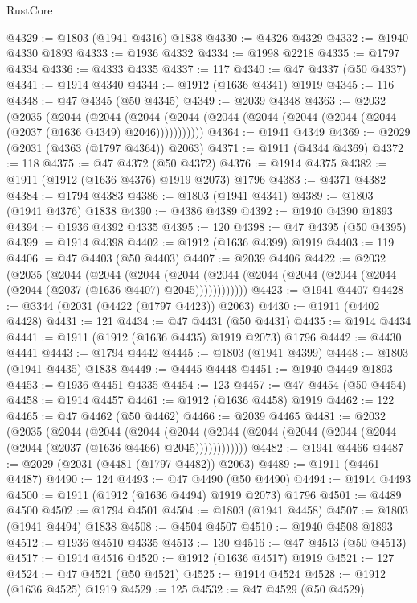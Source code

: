 \begin{lexlean}{RustCore}
\begin{coremodule}
@4329 := @1803 (@1941 @4316) @1838
@4330 := @4326 @4329
@4332 := @1940 @4330 @1893
@4333 := @1936 @4332
@4334 := @1998 @2218
@4335 := @1797 @4334
@4336 := @4333 @4335
@4337 := 117
@4340 := @47 @4337 (@50 @4337)
@4341 := @1914 @4340
@4344 := @1912 (@1636 @4341) @1919
@4345 := 116
@4348 := @47 @4345 (@50 @4345)
@4349 := @2039 @4348
@4363 := @2032
    (@2035
      (@2044
        (@2044
          (@2044 (@2044 (@2044 (@2044 (@2044 (@2044 (@2044 (@2037 (@1636 @4349) @2046)))))))))))
@4364 := @1941 @4349
@4369 := @2029 (@2031 (@4363 (@1797 @4364)) @2063)
@4371 := @1911 (@4344 @4369)
@4372 := 118
@4375 := @47 @4372 (@50 @4372)
@4376 := @1914 @4375
@4382 := @1911 (@1912 (@1636 @4376) @1919 @2073) @1796
@4383 := @4371 @4382
@4384 := @1794 @4383
@4386 := @1803 (@1941 @4341)
@4389 := @1803 (@1941 @4376) @1838
@4390 := @4386 @4389
@4392 := @1940 @4390 @1893
@4394 := @1936 @4392 @4335
@4395 := 120
@4398 := @47 @4395 (@50 @4395)
@4399 := @1914 @4398
@4402 := @1912 (@1636 @4399) @1919
@4403 := 119
@4406 := @47 @4403 (@50 @4403)
@4407 := @2039 @4406
@4422 := @2032
    (@2035
      (@2044
        (@2044
          (@2044
            (@2044 (@2044 (@2044 (@2044 (@2044 (@2044 (@2044 (@2037 (@1636 @4407) @2045))))))))))))
@4423 := @1941 @4407
@4428 := @3344 (@2031 (@4422 (@1797 @4423)) @2063)
@4430 := @1911 (@4402 @4428)
@4431 := 121
@4434 := @47 @4431 (@50 @4431)
@4435 := @1914 @4434
@4441 := @1911 (@1912 (@1636 @4435) @1919 @2073) @1796
@4442 := @4430 @4441
@4443 := @1794 @4442
@4445 := @1803 (@1941 @4399)
@4448 := @1803 (@1941 @4435) @1838
@4449 := @4445 @4448
@4451 := @1940 @4449 @1893
@4453 := @1936 @4451 @4335
@4454 := 123
@4457 := @47 @4454 (@50 @4454)
@4458 := @1914 @4457
@4461 := @1912 (@1636 @4458) @1919
@4462 := 122
@4465 := @47 @4462 (@50 @4462)
@4466 := @2039 @4465
@4481 := @2032
    (@2035
      (@2044
        (@2044
          (@2044
            (@2044 (@2044 (@2044 (@2044 (@2044 (@2044 (@2044 (@2037 (@1636 @4466) @2045))))))))))))
@4482 := @1941 @4466
@4487 := @2029 (@2031 (@4481 (@1797 @4482)) @2063)
@4489 := @1911 (@4461 @4487)
@4490 := 124
@4493 := @47 @4490 (@50 @4490)
@4494 := @1914 @4493
@4500 := @1911 (@1912 (@1636 @4494) @1919 @2073) @1796
@4501 := @4489 @4500
@4502 := @1794 @4501
@4504 := @1803 (@1941 @4458)
@4507 := @1803 (@1941 @4494) @1838
@4508 := @4504 @4507
@4510 := @1940 @4508 @1893
@4512 := @1936 @4510 @4335
@4513 := 130
@4516 := @47 @4513 (@50 @4513)
@4517 := @1914 @4516
@4520 := @1912 (@1636 @4517) @1919
@4521 := 127
@4524 := @47 @4521 (@50 @4521)
@4525 := @1914 @4524
@4528 := @1912 (@1636 @4525) @1919
@4529 := 125
@4532 := @47 @4529 (@50 @4529)

\end{coremodule}
\end{lexlean}
